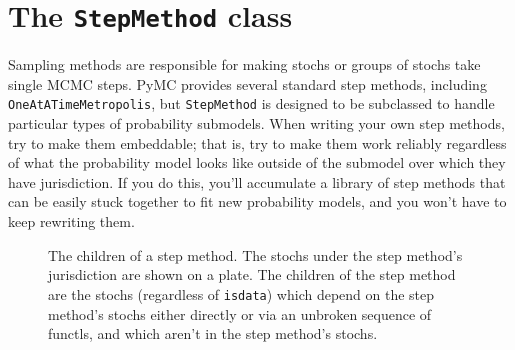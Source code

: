 \documentclass[]{book}
\begin{document}
\section{The \texttt{StepMethod} class}\label{sec:StepMethod}
Sampling methods are responsible for making stochs or groups of stochs take single MCMC steps. PyMC provides several standard step methods, including \texttt{OneAtATimeMetropolis}, but \texttt{StepMethod} is designed to be subclassed to handle particular types of probability submodels. When writing your own step methods, try to make them embeddable; that is, try to make them work reliably regardless of what the probability model looks like outside of the submodel over which they have jurisdiction. If you do this, you'll accumulate a library of step methods that can be easily stuck together to fit new probability models, and you won't have to keep rewriting them.

\begin{figure}[hhhhhhhhh]
    \centering
    \caption{The children of a step method. The stochs under the step method's jurisdiction are shown on a plate. The children of the step method are the stochs (regardless of \texttt{isdata}) which depend on the step method's stochs either directly or via an unbroken sequence of functls, and which aren't in the step method's stochs.}
    \label{fig:sampmethod_children}
\end{figure}
\end{document}

